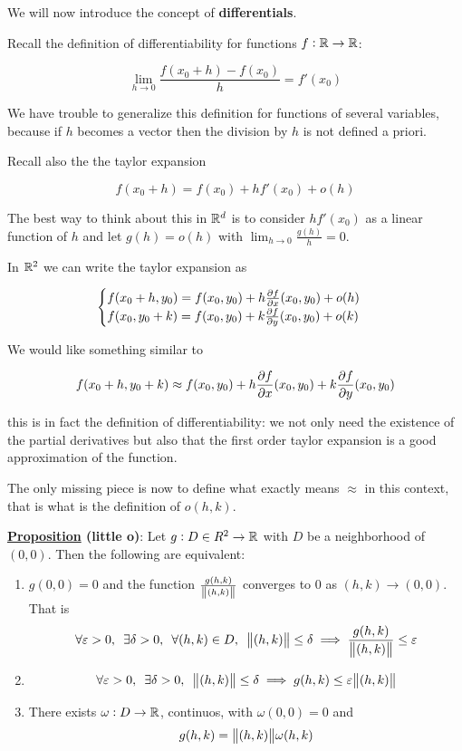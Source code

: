 \documentclass[10pt]{extarticle}
\begin{document}
We will now introduce the concept of \textbf{differentials}.

Recall the definition of differentiability for functions $f: \mathbb{R} \to \mathbb{R}$:

$$
    \lim_{h \to 0} \frac{f(x_0 + h) - f(x_0)}{h} = f'(x_0)
$$

We have trouble to generalize this definition for functions of several variables, because if $h$ becomes a vector then the division by $h$ is not defined a priori.

Recall also the the taylor expansion

$$
    f(x_0 + h) = f(x_0) + hf'(x_0) + o(h)
$$

The best way to think about this in $\mathbb{R}^d$ is to consider $hf'(x_0)$ as a linear function of $h$ and let $g(h) = o(h)$ with $\lim_{h \to 0} \frac{g(h)}{h} = 0$.

In $\mathbb{R}^2$ we can write the taylor expansion as

$$
    \begin{cases}
        f(x_0 + h, y_0) = f(x_0, y_0) + h \pdv{f}{x}()(x_0, y_0) + o(h) \\
        f(x_0, y_0 + k) = f(x_0, y_0) + k \pdv{f}{y}()(x_0, y_0) + o(k)
    \end{cases}
$$

We would like something similar to

$$
    f(x_0 + h, y_0 + k) \approx f(x_0, y_0) + h \pdv{f}{x}()(x_0, y_0) + k \pdv{f}{y}()(x_0, y_0)
$$

this is in fact the definition of differentiability: we not only need the existence of the partial derivatives but also that the first order taylor expansion is a good approximation of the function.

The only missing piece is now to define what exactly means $\approx$ in this context, that is what is the definition of $o(h, k)$.

\textbf{\underline{Proposition} (little o)}:
Let $g : D \in R^2 \to \mathbb{R}$ with $D$ be a neighborhood of $(0,0)$.
Then the following are equivalent:

\begin{enumerate}[label=(\roman*)]
    \item $g(0,0) = 0$ and the function $\frac{g(h,k)}{\norm{(h,k)}}$ converges to 0 as $(h,k) \to (0,0)$. That is
          $$
              \forall \varepsilon > 0, \enspace \exists \delta > 0, \enspace \forall (h,k) \in D, \enspace \norm{(h,k)} \leq \delta \implies \frac{g(h,k)}{\norm{(h,k)}} \leq \varepsilon
          $$
    \item
          $$
              \forall \varepsilon > 0, \enspace \exists \delta > 0, \enspace \norm{(h,k)} \leq \delta \implies g(h, k) \leq \varepsilon \norm{(h,k)}
          $$

    \item There exists $\omega: D \to \mathbb{R}$, continuos, with $\omega(0,0) = 0$ and
          $$
              g(h,k) = \norm{(h,k)} \omega(h,k)
          $$
\end{enumerate}
\end{document}
